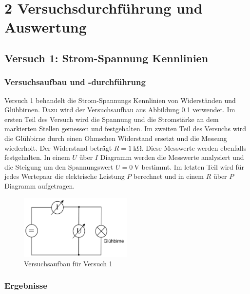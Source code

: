 \chapter*{2 Versuchsdurchführung und Auswertung}
\setcounter{chapter}{2}
\setcounter{section}{0}
\setcounter{subsection}{0}

\section{Versuch 1: Strom-Spannung Kennlinien}

    \subsection{Versuchsaufbau und -durchführung}

        Versuch 1 behandelt die Strom-Spannungs Kennlinien von Widerständen und Glühbirnen. Dazu wird der Versuchsaufbau aus Abbildung \ref{fig:versuch1} verwendet. Im ersten Teil des Versuch wird die Spannung und die Stromstärke an dem markierten Stellen gemessen und festgehalten. Im zweiten Teil des Versuchs wird die Glühbirne durch einen Ohmschen Widerstand ersetzt und die Messung wiederholt. Der Widerstand beträgt $R = 1\ \mathrm{k\Omega}$. Diese Messwerte werden ebenfalls festgehalten. In einem $U$ über $I$ Diagramm werden die Messwerte analysiert und die Steigung um den Spannungswert $U = 0\ \mathrm{V}$ bestimmt.
        Im letzten Teil wird für jedes Wertepaar die elektrische Leistung $P$ berechnet und in einem $R$ über $P$ Diagramm aufgetragen.

        \begin{figure}[ht!]
            \centering
            \includegraphics[width=0.5\textwidth]{bilder/Physik_01.png}
            \caption{Versuchsaufbau für Versuch 1}
            \label{fig:versuch1}
        \end{figure}
\newpage
    \subsection{Ergebnisse}

